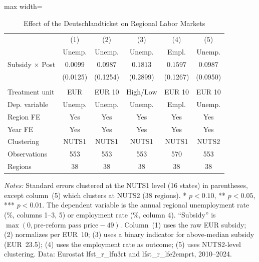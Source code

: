 \begin{table}[H]
\centering
\caption{Effect of the Deutschlandticket on Regional Labor Markets}
\label{tab:main}
\begin{threeparttable}
\begin{adjustbox}{max width=\textwidth}
\begin{tabular}{lccccc}
\toprule
 & (1) & (2) & (3) & (4) & (5) \\
 & Unemp. & Unemp. & Unemp. & Empl. & Unemp. \\
\midrule
Subsidy $\times$ Post & $0.0099$ & $0.0987$ & $0.1813$ & $0.1597$ & $0.0987$ \\
 & (0.0125) & (0.1254) & (0.2899) & (0.1267) & (0.0950) \\
 \\
\midrule
Treatment unit & EUR & EUR 10 & High/Low & EUR 10 & EUR 10 \\
Dep. variable & Unemp. & Unemp. & Unemp. & Empl. & Unemp. \\
Region FE & Yes & Yes & Yes & Yes & Yes \\
Year FE & Yes & Yes & Yes & Yes & Yes \\
Clustering & NUTS1 & NUTS1 & NUTS1 & NUTS1 & NUTS2 \\
Observations & 553 & 553 & 553 & 570 & 553 \\
Regions & 38 & 38 & 38 & 38 & 38 \\
\bottomrule
\end{tabular}
\end{adjustbox}
\begin{tablenotes}[flushleft]
\small
\item \textit{Notes:} Standard errors clustered at the NUTS1 level (16 states) in parentheses, except column~(5) which clusters at NUTS2 (38 regions). * $p<0.10$, ** $p<0.05$, *** $p<0.01$. The dependent variable is the annual regional unemployment rate (\%, columns 1--3, 5) or employment rate (\%, column 4). ``Subsidy'' is $\max(0, \text{pre-reform pass price} - 49)$. Column~(1) uses the raw EUR subsidy; (2) normalizes per EUR~10; (3) uses a binary indicator for above-median subsidy (EUR~23.5); (4) uses the employment rate as outcome; (5) uses NUTS2-level clustering. Data: Eurostat lfst\_r\_lfu3rt and lfst\_r\_lfe2emprt, 2010--2024.
\end{tablenotes}
\end{threeparttable}
\end{table}
